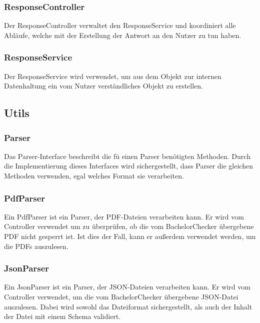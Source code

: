\subsubsection{ResponseController}\label{subsubsec:response_controller}
Der ResponseController verwaltet den ResponseService und koordiniert alle Abläufe,
welche mit der Erstellung der Antwort an den Nutzer zu tun haben.

\subsubsection{ResponseService}\label{subsubsec:response_service}
Der ResponseService wird verwendet, um aus dem Objekt zur internen Datenhaltung ein vom Nutzer verständliches Objekt zu erstellen.

\subsection{Utils}\label{subsec:utils}

\subsubsection{Parser}\label{subsubsec:parser}
Das Parser-Interface beschreibt die fü einen Parser benötigten Methoden.
Durch die Implementierung dieses Interfaces wird sichergestellt,
dass Parser die gleichen Methoden verwenden, egal welches Format sie verarbeiten.

\subsubsection{PdfParser}\label{subsubsec:pdf_parser}
Ein PdfParser ist ein Parser, der PDF-Dateien verarbeiten kann.
Er wird vom Controller verwendet um zu überprüfen, ob die vom BachelorChecker übergebene PDF nicht gesperrt ist.
Ist dies der Fall, kann er außerdem verwendet werden, um die PDFs auszulesen.

\subsubsection{JsonParser}\label{subsubsec:json_parser}
Ein JsonParser ist ein Parser, der JSON-Dateien verarbeiten kann.
Er wird vom Controller verwendet, um die vom BachelorChecker übergebene JSON-Datei auszulesen.
Dabei wird sowohl das Dateiformat sichergestellt, als auch der Inhalt der Datei mit einem Schema validiert.